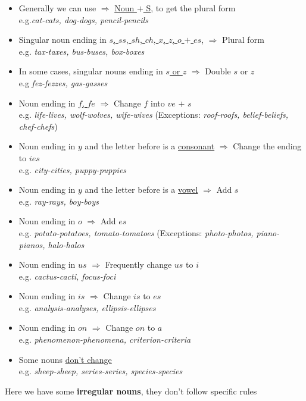 \documentclass[hidelinks,10pt,a4paper]{article}
\begin{document}
\begin{itemize}
		\item Generally we can use $\Rightarrow$ \underline{Noun $+$ S}, to get the plural form \\e.g.\textit{cat-cats, dog-dogs, pencil-pencils}
		\item Singular noun ending in \underline{$s$, $ss$, $sh$, $ch$, $x$, $z$, $o$ $+$ $es$}, $\Rightarrow$ Plural form \\ e.g. \textit{ tax-taxes, bus-buses, box-boxes}
		\item In some cases, singular nouns ending in \underline{$s$ or $z$} $\Rightarrow$ Double $s$ or $z$ \\
			e.g \textit{fez-fezzes, gas-gasses}
		\item Noun ending in \underline{$f$, $fe$} $\Rightarrow$ Change $f$ into $ve$ $+$ $s$ \\e.g. \textit{life-lives, wolf-wolves, wife-wives} \quad (Exceptions: \textit{roof-roofs, belief-beliefs, chef-chefs})
		\item Noun ending in $y$ and the letter before is a \underline{consonant} $\Rightarrow$ Change the ending to $ies$ \\
			e.g. \textit{city-cities, puppy-puppies}
		\item Noun ending in $y$ and the letter before is a \underline{vowel} $\Rightarrow$ Add $s$ \\
			e.g. \textit{ray-rays, boy-boys}
		\item Noun ending in $o$ $\Rightarrow$ Add $es$ \\
			e.g. \textit{potato-potatoes, tomato-tomatoes} \quad (Exceptions: \textit{photo-photos, piano-pianos, halo-halos}
		\item Noun ending in $us$ $\Rightarrow$ Frequently change $us$ to $i$ \\
			e.g. \textit{cactus-cacti, focus-foci}
		\item Noun ending in $is$ $\Rightarrow$ Change $is$ to $es$ \\
			e.g. \textit{analysis-analyses, ellipsis-ellipses}
		\item Noun ending in $on$ $\Rightarrow$ Change $on$ to $a$ \\
			e.g. \textit{phenomenon-phenomena, criterion-criteria}
		\item Some nouns \underline{don't change} \\
			e.g. \textit{sheep-sheep, series-series, species-species}
\end{itemize}
Here we have some \textbf{irregular nouns}, they don't follow specific rules\\
\end{document}
